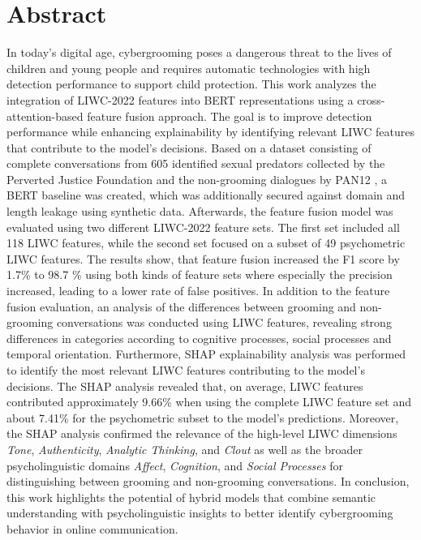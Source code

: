 \chapter{Abstract}

In today's digital age, cybergrooming poses a dangerous threat to the lives of children and young people and requires automatic technologies with high detection performance to support child protection. This work analyzes the integration of LIWC-2022 features \cite{pennebaker2022liwc} into BERT representations \cite{devlin2019bert} using a cross-attention-based feature fusion approach. The goal is to improve detection performance while enhancing explainability by identifying relevant LIWC features that contribute to the model's decisions. Based on a dataset consisting of complete conversations from 605 identified sexual predators collected by the Perverted Justice Foundation \cite{pj} and the non-grooming dialogues by PAN12 \cite{inches2012pan}, a BERT baseline was created, which was additionally secured against domain and length leakage using synthetic data. Afterwards, the feature fusion model was evaluated using two different LIWC-2022 feature sets. The first set included all 118 LIWC features, while the second set focused on a subset of 49 psychometric LIWC features. The results show, that feature fusion increased the F1 score by 1.7\% to 98.7 \% using both kinds of feature sets where especially the precision increased, leading to a lower rate of false positives. In addition to the feature fusion evaluation, an analysis of the differences between grooming and non-grooming conversations was conducted using LIWC features, revealing strong differences in categories according to cognitive processes, social processes and temporal orientation. Furthermore, SHAP \cite{lundberg2017shap} explainability analysis was performed to identify the most relevant LIWC features contributing to the model's decisions. The SHAP analysis revealed that, on average, LIWC features contributed approximately 9.66\% when using the complete LIWC feature set and about 7.41\% for the psychometric subset to the model’s predictions. Moreover, the SHAP analysis confirmed the relevance of the high-level LIWC dimensions \textit{Tone}, \textit{Authenticity}, \textit{Analytic Thinking}, and \textit{Clout} as well as the broader psycholinguistic domains \textit{Affect}, \textit{Cognition}, and \textit{Social Processes} for distinguishing between grooming and non-grooming conversations. In conclusion, this work highlights the potential of hybrid models that combine semantic understanding with psycholinguistic insights to better identify cybergrooming behavior in online communication.


